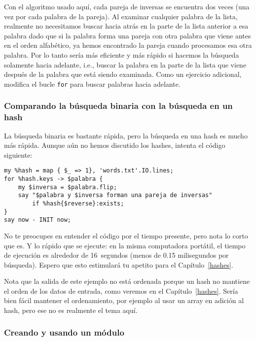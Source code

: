 Con el algoritmo usado aquí, cada pareja de inversas
se encuentra dos veces (una vez por cada palabra de la
pareja). Al examinar cualquier palabra de la lista, 
realmente no necesitamos buscar hacia atrás en la parte de la
lista anterior a esa palabra dado que si la palabra 
forma una pareja con otra palabra que viene antes
en el orden alfabético, ya hemos encontrado la pareja
cuando procesamos esa otra palabra. Por lo tanto sería
más eficiente y más rápido si hacemos la búsqueda solamente hacia
adelante, i.e., buscar la palabra en la parte de la lista
que viene después de la palabra que está siendo examinada.
Como un ejercicio adicional, modifica el bucle {\tt for} 
para buscar palabras hacia adelante.

\subsubsection{Comparando la búsqueda binaria con la búsqueda en un hash}

La búsqueda binaria es bastante rápida, pero la búsqueda en 
una hash es mucho más rápida. Aunque aún no hemos discutido los
hashes, intenta el código siguiente:

\begin{verbatim}
my %hash = map { $_ => 1}, 'words.txt'.IO.lines;
for %hash.keys -> $palabra {
    my $inversa = $palabra.flip;
    say "$palabra y $inversa forman una pareja de inversas" 
        if %hash{$reverse}:exists;
}
say now - INIT now;
\end{verbatim}

No te preocupes en entender el código por el tiempo presente,
pero nota lo corto que es. Y lo rápido que se ejecute:
en la misma computadora portátil, el tiempo de ejecución
es alrededor de 16~segundos (menos de 0.15 milisegundos por búsqueda).
Espero que esto estimulará tu apetito para el Capítulo~\ref{hashes}.

Nota que la salida de este ejemplo no está ordenada porque
un hash no mantiene el orden de los datos de entrada, como veremos
en el Capítulo~\ref{hashes}. Sería bien fácil mantener el ordenamiento,
por ejemplo al usar un array en adición al hash, pero ese no es realmente
el tema aquí.

\subsubsection{Creando y usando un módulo}

